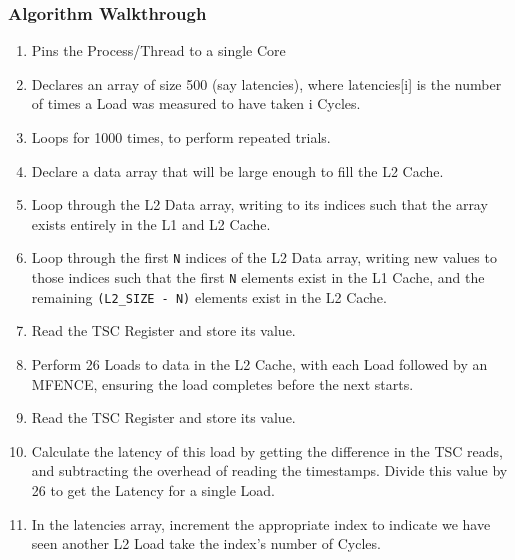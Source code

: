 \documentclass[bsc,frontabs,twoside,singlespacing,parskip,deptreport]{infthesis}     %
\begin{document}
\subsubsection{Algorithm Walkthrough}
\begin{enumerate}
    \item Pins the Process/Thread to a single Core
    \item Declares an array of size 500 (say latencies), where latencies[i] is the number of times a Load was measured to have taken i Cycles.
    \item Loops for 1000 times, to perform repeated trials.
    \item Declare a data array that will be large enough to fill the L2 Cache.
    \item Loop through the L2 Data array, writing to its indices such that the array exists entirely in the L1 and L2 Cache.
    \item Loop through the first \texttt{N} indices of the L2 Data array, writing new values to those indices such that the first \texttt{N} elements exist in the L1 Cache, and the remaining \texttt{(L2\_SIZE - N)} elements exist in the L2 Cache.
    \item Read the TSC Register and store its value.
    \item Perform 26 Loads to data in the L2 Cache, with each Load followed by an MFENCE\cite{mfence_spec}, ensuring the load completes before the next starts.
    \item Read the TSC Register and store its value.
    \item Calculate the latency of this load by getting the difference in the TSC reads, and subtracting the overhead of reading the timestamps. Divide this value by 26 to get the Latency for a single Load.
    \item In the latencies array, increment the appropriate index to indicate we have seen another L2 Load take the index's number of Cycles.
\end{enumerate}
\end{document}
